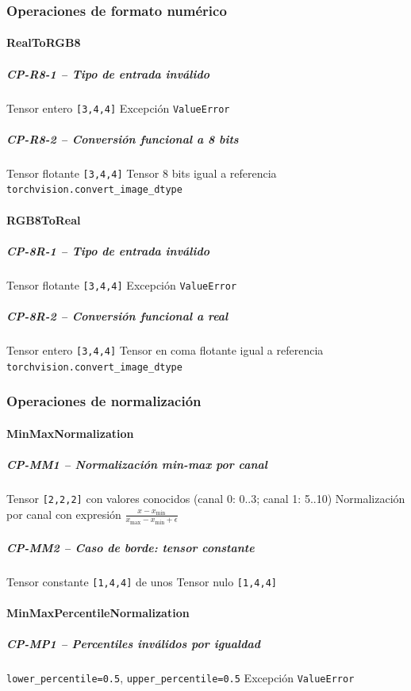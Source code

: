 \newpage

\subsubsection{Operaciones de formato numérico} \label{subsubsec:8_2_5_format}

\paragraph{RealToRGB8}
\subparagraph{CP-R8-1 -- Tipo de entrada inválido}\label{cp:CP-R8-1}
\testcasetable
{Tensor entero \texttt{[3,4,4]}}
{Excepción \texttt{ValueError}}

\subparagraph{CP-R8-2 -- Conversión funcional a 8 bits}\label{cp:CP-R8-2}
\testcasetable
{Tensor flotante \texttt{[3,4,4]}}
{Tensor 8 bits igual a referencia \texttt{torchvision.convert\_image\_dtype}}

\paragraph{RGB8ToReal}
\subparagraph{CP-8R-1 -- Tipo de entrada inválido}\label{cp:CP-8R-1}
\testcasetable
{Tensor flotante \texttt{[3,4,4]}}
{Excepción \texttt{ValueError}}

\subparagraph{CP-8R-2 -- Conversión funcional a real}\label{cp:CP-8R-2}
\testcasetable
{Tensor entero \texttt{[3,4,4]}}
{Tensor en coma flotante igual a referencia \texttt{torchvision.convert\_image\_dtype}}

\newpage

\subsubsection{Operaciones de normalización} \label{subsubsec:8_2_6_normalization}

\paragraph{MinMaxNormalization}
\subparagraph{CP-MM1 -- Normalización min-max por canal}\label{cp:CP-MM1}
\testcasetable
{Tensor \texttt{[2,2,2]} con valores conocidos (canal 0: 0..3; canal 1: 5..10)}
{Normalización por canal con expresión $\frac{x-x_{\min}}{x_{\max}-x_{\min}+\epsilon}$}

\subparagraph{CP-MM2 -- Caso de borde: tensor constante}\label{cp:CP-MM2}
\testcasetable
{Tensor constante \texttt{[1,4,4]} de unos}
{Tensor nulo \texttt{[1,4,4]}}

\paragraph{MinMaxPercentileNormalization}
\subparagraph{CP-MP1 -- Percentiles inválidos por igualdad}\label{cp:CP-MP1}
\testcasetable
{\texttt{lower\_percentile=0.5}, \texttt{upper\_percentile=0.5}}
{Excepción \texttt{ValueError}}

